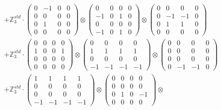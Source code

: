 \documentclass{article}
\begin{document}
{\begin{align}
        &+ \label{Rs16-Rc11-Solution-7-c22} \mathbb{Z}_3^{std} \cdot 
            \begin{pmatrix} 0 & -1 & 0 & 0 \\ 0 & 0 & 0 & 0 \\ 0 & 1 & 0 & 0 \\ 0 & 0 & 0 & 0 \end{pmatrix} \otimes 
            \begin{pmatrix} 0 & 0 & 0 & 0 \\ -1 & 0 & 1 & 0 \\ 0 & 0 & 0 & 0 \\ -1 & 0 & 1 & 0 \end{pmatrix} \otimes 
            \begin{pmatrix} 0 & 0 & 0 & 0 \\ 0 & -1 & -1 & 0 \\ 0 & 1 & 1 & 0 \\ 0 & 0 & 0 & 0 \end{pmatrix} \\ 
        &+ \label{Rs16-Rc11-Solution-7-c23} \mathbb{Z}_3^{std} \cdot 
            \begin{pmatrix} 0 & 0 & 0 & 0 \\ 1 & 0 & 0 & 1 \\ 0 & 0 & 0 & 0 \\ 0 & 0 & 0 & 0 \end{pmatrix} \otimes 
            \begin{pmatrix} 0 & 0 & 0 & 0 \\ 1 & 1 & 1 & 1 \\ 0 & 0 & 0 & 0 \\ -1 & -1 & -1 & -1 \end{pmatrix} \otimes 
            \begin{pmatrix} 0 & 0 & 0 & 0 \\ 0 & 0 & 0 & 0 \\ 0 & 0 & 0 & 0 \\ 0 & -1 & -1 & 0 \end{pmatrix} \\ 
        &+ \label{Rs16-Rc11-Solution-7-c24} \mathbb{Z}_3^{std} \cdot 
            \begin{pmatrix} 1 & 1 & 1 & 1 \\ 0 & 0 & 0 & 0 \\ 0 & 0 & 0 & 0 \\ -1 & -1 & -1 & -1 \end{pmatrix} \otimes 
            \begin{pmatrix} 0 & 0 & 0 & 0 \\ 0 & 0 & 0 & 0 \\ 0 & 1 & 0 & -1 \\ 0 & 0 & 0 & 0 \end{pmatrix} \otimes 

\end{align}}
\end{document}
